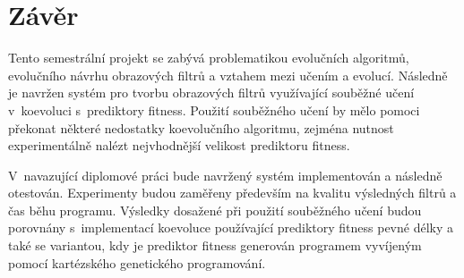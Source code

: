 \chapter{Závěr}
\label{chConclusions}

Tento semestrální projekt se zabývá problematikou evolučních algoritmů, evolučního návrhu obrazových filtrů a vztahem mezi učením a evolucí. Následně je navržen systém pro tvorbu obrazových filtrů využívající souběžné učení v~koevoluci s~prediktory fitness. Použití souběžného učení by mělo pomoci překonat některé nedostatky koevolučního algoritmu, zejména nutnost experimentálně nalézt nejvhodnější velikost prediktoru fitness.


V~navazující diplomové práci bude navržený systém implementován a následně otestován. Experimenty budou zaměřeny především na kvalitu výsledných filtrů a čas běhu programu. Výsledky dosažené při použití souběžného učení budou porovnány s~implementací koevoluce používající prediktory fitness pevné délky a také se variantou, kdy je prediktor fitness generován programem vyvíjeným pomocí kartézského genetického programování.
